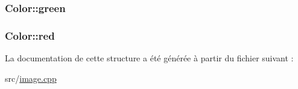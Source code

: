 \subsubsection[{green}]{ Color\+::green}\label{struct_color_a8a10c15fc75f5e90263b7fa4eb1c8e36}
\hypertarget{struct_color_af84e8322aff195c692b0e5cf9ed01fe1}{}
\subsubsection[{red}]{ Color\+::red}\label{struct_color_af84e8322aff195c692b0e5cf9ed01fe1}


La documentation de cette structure a été générée à partir du fichier suivant \+:\begin{DoxyCompactItemize}
\item 
src/\hyperlink{image_8cpp}{image.\+cpp}\end{DoxyCompactItemize}
